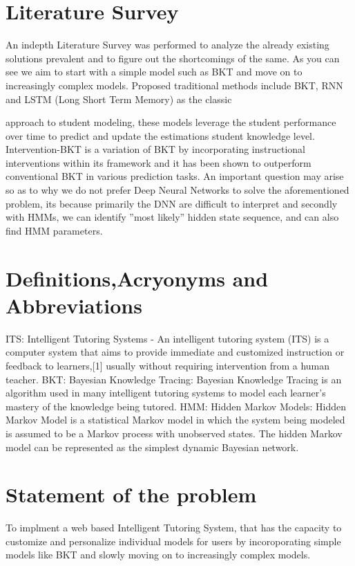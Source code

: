 \documentclass[12pt,a4paper,oneside]{report}
\begin{document}
 \section{Literature Survey}
 An indepth Literature Survey was performed to analyze the already existing solutions prevalent and to
figure out the shortcomings of the same.
As you can see we aim to start with a simple model such as BKT and move on to increasingly complex
models.
Proposed traditional methods include BKT, RNN and LSTM (Long Short Term Memory) as the classic

approach to student modeling, these models leverage the student performance over time to predict and
update the estimations student knowledge level.
Intervention-BKT is a variation of BKT by incorporating instructional interventions within its framework
and it has been shown to outperform conventional BKT in various prediction tasks.
An important question may arise so as to why we do not prefer Deep Neural Networks to solve the
aforementioned problem, its because primarily the DNN are difficult to interpret and secondly with
HMMs, we can identify ”most likely” hidden state sequence, and can also find HMM parameters.

\section{Definitions,Acryonyms and Abbreviations}
ITS: Intelligent Tutoring Systems - An intelligent tutoring system (ITS) is a computer system that aims to provide immediate and customized instruction or feedback to learners,[1] usually without requiring intervention from a human teacher.
BKT: Bayesian Knowledge Tracing: Bayesian Knowledge Tracing is an algorithm used in many intelligent tutoring systems to model each learner's mastery of the knowledge being tutored.
HMM: Hidden Markov Models: Hidden Markov Model is a statistical Markov model in which the system being modeled is assumed to be a Markov process with unobserved states. The hidden Markov model can be represented as the simplest dynamic Bayesian network.

\section{Statement of the problem}
To implment a web based Intelligent Tutoring System, that has the capacity to customize and personalize individual models for users by incoroporating simple models like BKT and slowly moving on to increasingly complex models.
\end{document}
